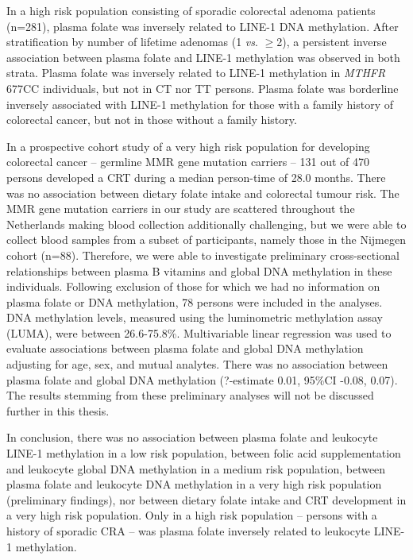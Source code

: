 \noindent In a high risk population consisting of sporadic colorectal adenoma patients (n=281), plasma folate was inversely related to LINE-1 DNA methylation. After stratification by number of lifetime adenomas (1 \emph{vs}. $\geq$2), a persistent inverse association between plasma folate and LINE-1 methylation was observed in both strata. Plasma folate was inversely related to LINE-1 methylation in \emph{MTHFR} 677CC individuals, but not in CT nor TT persons. Plasma folate was borderline inversely associated with LINE-1 methylation for those with a family history of colorectal cancer, but not in those without a family history. 
 
\noindent In a prospective cohort study of a very high risk population for developing colorectal cancer -- germline MMR gene mutation carriers -- 131 out of 470 persons developed a CRT during a median person-time of 28.0 months. There was no association between dietary folate intake and colorectal tumour risk. The MMR gene mutation carriers in our study are scattered throughout the Netherlands making blood collection additionally challenging, but we were able to collect blood samples from a subset of participants, namely those in the Nijmegen cohort (n=88). Therefore, we were able to investigate preliminary cross-sectional relationships between plasma B vitamins and global DNA methylation in these individuals. Following exclusion of those for which we had no information on plasma folate or DNA methylation, 78 persons were included in the analyses. DNA methylation levels, measured using the luminometric methylation assay (LUMA), were between 26.6-75.8\%. Multivariable linear regression was used to evaluate 
associations between plasma folate and global DNA methylation adjusting for age, sex, and mutual analytes. There was no association between plasma folate and global DNA methylation (?-estimate 0.01, 95\%CI -0.08, 0.07). The results stemming from these preliminary analyses will not be discussed further in this thesis. 
 
\noindent In conclusion, there was no association between plasma folate and leukocyte LINE-1 methylation in a low risk population, between folic acid supplementation and leukocyte global DNA methylation in a medium risk population, between plasma folate and leukocyte DNA methylation in a very high risk population (preliminary findings), nor between dietary folate intake and CRT development in a very high risk population. Only in a high risk population -- persons with a history of sporadic CRA -- was plasma folate inversely related to leukocyte LINE-1 methylation. 
 
